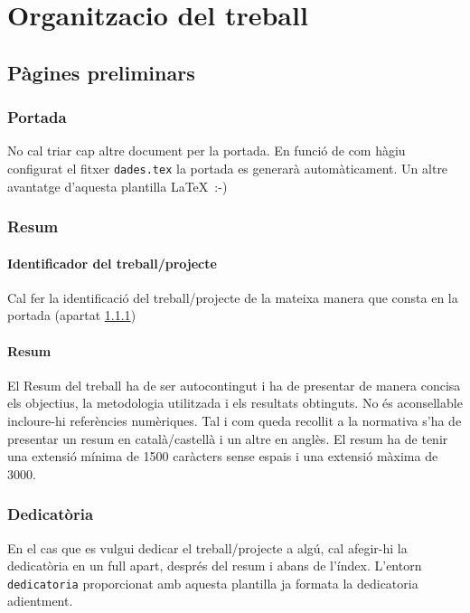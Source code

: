 \chapter{Organitzacio del treball}

\section{Pàgines preliminars}

\subsection{Portada}\label{S:portada}

No cal triar cap altre document per la portada. En funció de com hàgiu configurat el fitxer \texttt{dades.tex} la portada es generarà automàticament. Un altre avantatge d'aquesta plantilla \LaTeX \ :-)

\subsection{Resum}

\subsubsection{Identificador del treball/projecte}

Cal fer la identificació del treball/projecte de la mateixa manera que consta en la portada (apartat \ref{S:portada})

\subsubsection{Resum}

El Resum del treball ha de ser autocontingut i ha de presentar de manera concisa els objectius, la metodologia utilitzada i els resultats obtinguts. No és aconsellable incloure-hi referències numèriques. Tal i com queda recollit a la normativa s'ha de presentar un resum en català/castellà i un altre en anglès. El resum ha de tenir una extensió mínima de 1500 caràcters sense espais i una extensió màxima de 3000.


\subsection{Dedicatòria}

En el cas que es vulgui dedicar el treball/projecte a algú, cal afegir-hi la dedicatòria en un full apart, després del resum i abans de l'índex. L'entorn \texttt{dedicatoria} proporcionat amb aquesta plantilla ja formata la dedicatoria adientment. 


